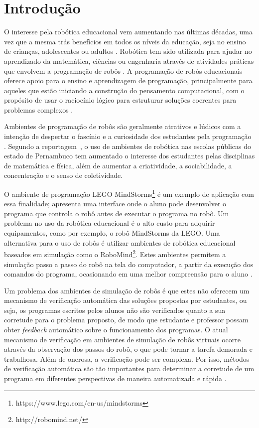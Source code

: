 \chapter{Introdução}

O interesse pela robótica educacional vem aumentando nas últimas décadas, uma vez que a mesma trás benefícios em todos os níveis da educação, seja no ensino de crianças, adolescentes ou adultos \cite{alimisis}. Robótica tem sido utilizada para ajudar no aprendizado da matemática, ciências ou engenharia através de atividades práticas que envolvem a programação de robôs \cite{Benitti2012}. A programação de robôs educacionais oferece apoio para o ensino e aprendizagem de programação, principalmente para aqueles que estão iniciando a construção do pensamento computacional, com o propósito de usar o raciocínio lógico para estruturar soluções coerentes para problemas complexos \cite{Bombasar2015}.

Ambientes de programação de robôs são geralmente atrativos e lúdicos com a intenção de despertar o fascínio e a curiosidade dos estudantes pela programação \cite{ESILVA}. Segundo a reportagem~, o uso de ambientes de robótica nas escolas públicas do estado de Pernambuco tem aumentado o interesse dos estudantes pelas disciplinas de matemática e física, além de aumentar a criatividade, a sociabilidade, a concentração e o senso de coletividade.

O ambiente de programação LEGO MindStorms\footnote[1]{https://www.lego.com/en-us/mindstorms} é um exemplo de aplicação com essa finalidade; apresenta uma interface onde o aluno pode desenvolver o programa que controla o robô antes de executar o programa no robô. Um problema no uso da robótica educacional é o alto custo para adquirir equipamentos, como por exemplo, o robô MindStorms da LEGO. Uma alternativa para o uso de robôs é utilizar ambientes de robótica educacional baseados em simulação como o RoboMind\footnote[2]{http://robomind.net/}. Estes ambientes permitem a simulação passo a passo do robô na tela do computador, a partir da execução dos comandos do programa, ocasionando em uma melhor compreensão para o aluno \cite{Lessa2015}. 

Um problema dos ambientes de simulação de robôs é que estes não oferecem um mecanismo de verificação automática das soluções propostas por estudantes, ou seja, os programas escritos pelos alunos não são verificados quanto a sua corretude para o problema proposto, de modo que estudante e professor possam obter \textit{feedback} automático sobre o funcionamento dos programas. O atual mecanismo de verificação em ambientes de simulação de robôs virtuais ocorre através da observação dos passos do robô, o que pode tornar a tarefa demorada e trabalhosa. Além de onerosa, a verificação pode ser complexa. Por isso, métodos de verificação automática são tão importantes para determinar a corretude de um programa em diferentes perspectivas de maneira automatizada e rápida \cite{Duarte}. 

